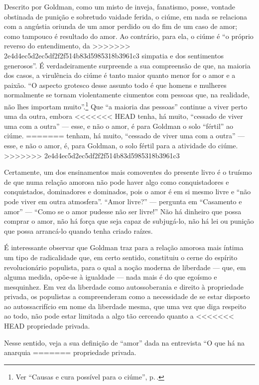 {Descrito por Goldman, como um misto de inveja, fanatismo, posse,
vontade obstinada de punição e sobretudo vaidade ferida, o ciúme, em
nada se relaciona com a angústia oriunda de um amor perdido ou
do fim de um caso de amor; como tampouco é resultado do amor. Ao
contrário, para ela, o ciúme é ``o próprio reverso do entendimento, da
>>>>>>> 2e4d4ec5d2ec5df2f2f514b83d5985318b3961c3
simpatia e dos sentimentos generosos''. É verdadeiramente surpreende a
sua compreensão de que, na maioria dos casos, a virulência do ciúme é
tanto maior quanto menor for o amor e a paixão. ``O aspecto grotesco
desse assunto todo é que homens e mulheres normalmente se tornam violentamente
ciumentos com pessoas que, na realidade, não lhes importam muito''.\footnote{Ver ``Causas e cura possível para o ciúme'', p.\,\pageref{ciume}.} Que
``a maioria das pessoas'' continue a viver perto uma da outra, embora
<<<<<<< HEAD
tenha, há muito, ``cessado de viver uma com a outra'' --- esse, e não o
amor, é para Goldman o solo ``fértil'' ao ciúme.
=======
tenham, há muito, ``cessado de viver uma com a outra'' --- esse, e não o
amor, é, para Goldman, o solo fértil para a atividade do ciúme.
>>>>>>> 2e4d4ec5d2ec5df2f2f514b83d5985318b3961c3

Certamente, um dos ensinamentos mais comoventes do presente livro é o
truísmo de que numa relação amorosa não pode haver algo como
conquistadores e conquistados, dominadores e dominados, pois o amor é em
si mesmo livre e ``não pode viver em outra atmosfera''. ``Amor livre?''
--- pergunta em ``Casamento e amor'' --- ``Como se o amor pudesse não ser
livre!'' Não há dinheiro que possa comprar o amor, não há força que seja
capaz de subjugá-lo, não há lei ou punição que possa arrancá-lo quando
tenha criado raízes.

É interessante observar que Goldman traz para a
relação amorosa mais íntima um tipo de radicalidade que, em certo
sentido, constituiu o cerne do espírito revolucionário populista, para o
qual a noção moderna de liberdade --- que, em alguma medida,
opõe-se à igualdade --- nada mais é do que egoísmo e mesquinhez. Em vez
da liberdade como autossoberania e direito à propriedade privada, os
populistas a compreenderam como a necessidade de se estar disposto ao
autossacrifício em nome da liberdade mesma, que uma vez que diga
respeito ao todo, não pode estar limitada a algo tão cerceado quanto a
<<<<<<< HEAD
propriedade privada.

Nesse sentido, veja a sua definição de ``amor''
dada na entrevista ``O que há na anarquia
=======
propriedade privada. 

}
